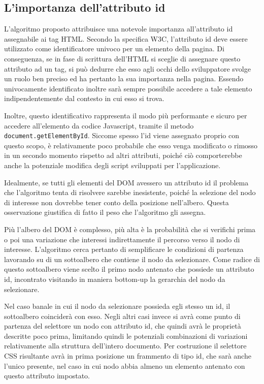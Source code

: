 \documentclass[12pt]{toptesi}
\begin{document}
\subsection {L'importanza dell'attributo id}

L'algoritmo proposto attribuisce una notevole importanza all'attributo id assegnabile ai tag HTML. Secondo la specifica W3C, l'attributo id deve essere utilizzato come identificatore univoco per un elemento della pagina. Di conseguenza, se in fase di scrittura dell'HTML si sceglie di assegnare questo attributo ad un tag, si può dedurre che esso agli occhi dello sviluppatore svolge un ruolo ben preciso ed ha pertanto la sua importanza nella pagina. Essendo univocamente identificato inoltre sarà sempre possibile accedere a tale elemento indipendentemente dal contesto in cui esso si trova. 

Inoltre, questo identificativo rappresenta il modo più performante e sicuro per accedere all'elemento da codice Javascript, tramite il metodo \verb|document.getElementById|. Siccome spesso l'id viene assegnato proprio con questo scopo, è relativamente poco probabile che esso venga modificato o rimosso in un secondo momento rispetto ad altri attributi, poiché ciò comporterebbe anche la potenziale modifica degli script sviluppati per l'applicazione.

Idealmente, se tutti gli elementi del DOM avessero un attributo id il problema che l'algoritmo tenta di risolvere sarebbe inesistente, poiché la selezione del nodo di interesse non dovrebbe tener conto della posizione nell'albero. Questa osservazione giustifica di fatto il peso che l'algoritmo gli assegna. 

Più l'albero del DOM è complesso, più alta è la probabilità che si verifichi prima o poi una variazione che interessi indirettamente il percorso verso il nodo di interesse. L'algoritmo cerca pertanto di semplificare le condizioni di partenza lavorando su di un sottoalbero che contiene il nodo da selezionare. Come radice di questo sottoalbero viene scelto il primo nodo antenato che possiede un attributo id, incontrato visitando in maniera bottom-up la gerarchia del nodo da selezionare. 

Nel caso banale in cui il nodo da selezionare possieda egli stesso un id, il sottoalbero coinciderà con esso. Negli altri casi invece si avrà come punto di partenza del selettore un nodo con attributo id, che quindi avrà le proprietà descritte poco prima, limitando quindi le potenziali combinazioni di variazioni relativamente alla struttura dell'intero documento. Per costruzione il selettore CSS risultante avrà in prima posizione un frammento di tipo id, che sarà anche l'unico presente, nel caso in cui nodo abbia almeno un elemento antenato con questo attributo impostato. 
\end{document}

